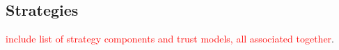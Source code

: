 \documentclass[]{final_report}
\begin{document}
\subsection{Strategies}
\label{appendix:strats}
\textcolor{red}{include list of strategy components and trust models, all associated together}.
\end{document}
